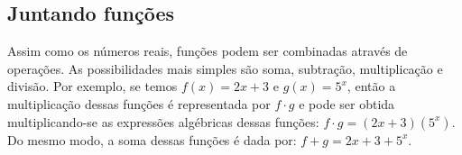 \documentclass[main_estudante.tex]{subfiles}
\begin{document}






\subsection*{Juntando funções}

Assim como os números reais, funções podem ser combinadas através de operações. As possibilidades mais simples são soma, subtração, multiplicação e divisão. Por exemplo, se temos $f(x)=2x+3$ e $g(x)=5^x$, então a multiplicação dessas funções é representada por $f \cdot g$ e pode ser obtida multiplicando-se as expressões algébricas dessas funções: $f \cdot g = (2x+3)(5^x)$. Do mesmo modo, a soma dessas funções é dada por: $f+g = 2x+3+5^x$.
\end{document}
